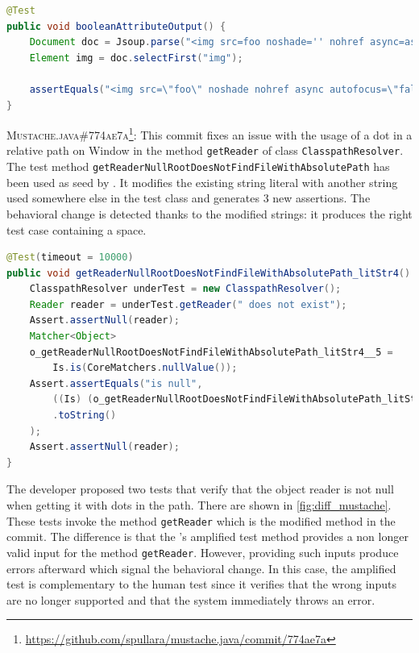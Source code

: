 \begin{lstlisting}[language=java,caption=Provided test by the developer for \textsc{3676b13} of Jsoup.,label=fig:diff_jsoup]
@Test
public void booleanAttributeOutput() {
	Document doc = Jsoup.parse("<img src=foo noshade='' nohref async=async autofocus=false>");
	Element img = doc.selectFirst("img");

	assertEquals("<img src=\"foo\" noshade nohref async autofocus=\"false\">", img.outerHtml());
}
\end{lstlisting}

\textsc{Mustache.java\#774ae7a}\footnote{\url{https://github.com/spullara/mustache.java/commit/774ae7a}}: This commit fixes an issue with the usage of a dot in a relative path on Window in the method \texttt{getReader} of class \texttt{ClasspathResolver}.
The test method \texttt{getReaderNullRootDoesNotFindFileWithAbsolutePath} has been used as seed by \DCI.
It modifies the existing string literal with another string used somewhere else in the test class and generates 3 new assertions.
The behavioral change is detected thanks to the modified strings: it produces the right test case containing a space.

\begin{lstlisting}[language=java,caption=Test generated by \DCII that detects the behavioral change of \textsc{774ae7a} of Mustache.java.,label=fig:ampl_mustache]
@Test(timeout = 10000)
public void getReaderNullRootDoesNotFindFileWithAbsolutePath_litStr4() {
	ClasspathResolver underTest = new ClasspathResolver();
	Reader reader = underTest.getReader(" does not exist");
	Assert.assertNull(reader);
	Matcher<Object> 
	o_getReaderNullRootDoesNotFindFileWithAbsolutePath_litStr4__5 =
		Is.is(CoreMatchers.nullValue());
	Assert.assertEquals("is null", 
		((Is) (o_getReaderNullRootDoesNotFindFileWithAbsolutePath_litStr4__5))
		.toString()
	);
	Assert.assertNull(reader);
}
\end{lstlisting}

The developer proposed two tests that verify that the object reader is not null when getting it with dots in the path.
There are shown in \autoref{fig:diff_mustache}.
These tests invoke the method \texttt{getReader} which is the modified method in the commit.
%
The difference is that the \DCII's amplified test method provides a non longer valid input for the method \texttt{getReader}.
However, providing such inputs produce errors afterward which signal the behavioral change.
In this case, the amplified test is complementary to the human test since it verifies that the wrong inputs are no longer supported and that the system immediately throws an error.

